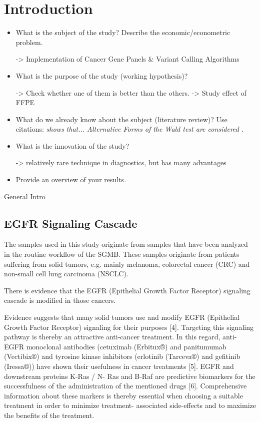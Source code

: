 \section{Introduction}

\begin{itemize}

\item What is the subject of the study? Describe the
economic/econometric problem.

-> Implementation of Cancer Gene Panels & Variant Calling Algorithms

\item What is the purpose of the study (working hypothesis)?

-> Check whether one of them is better than the others.
-> Study effect of FFPE

\item What do we already know about the subject (literature
review)? Use citations: {\it \citet{Gallant:87} shows that...
Alternative Forms of the Wald test are considered
\citep{Breusch&Schmidt:88}.}

\item What is the innovation of the study?

-> relatively rare technique in diagnostics, but has many advantages

\item Provide an overview of your results.


\end{itemize}

General Intro

\subsection{EGFR Signaling Cascade}

The samples used in this study originate from samples that have been analyzed in
the routine workflow of the SGMB. These samples originate from patients suffering
from solid tumors, e.g. mainly melanoma, colorectal cancer (CRC) and non-small cell
lung carcinoma (NSCLC).

There is evidence that the EGFR (Epithelial Growth Factor Receptor) signaling
cascade is modified in those cancers.

Evidence suggests that many solid tumors use and modify EGFR (Epithelial
Growth Factor Receptor) signaling for their purposes [4]. Targeting this
signaling pathway is thereby an attractive anti-cancer treatment. In this
regard, anti-EGFR monoclonal antibodies (cetuximab (Erbitux®) and panitumumab
(Vectibix®) and tyrosine kinase inhibitors (erlotinib (Tarceva®) and gefitinib
(Iressa®)) have shown their usefulness in cancer treatments [5]. EGFR and
downstream proteins K-Ras / N- Ras and B-Raf are predictive biomarkers for the
successfulness of the administration of the mentioned drugs [6]. Comprehensive
information about these markers is thereby essential when choosing a suitable
treatment in order to minimize treatment- associated side-effects and to
maximize the benefits of the treatment.

